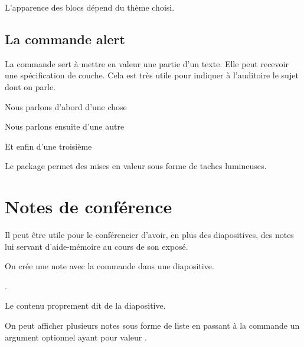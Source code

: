 L'apparence des blocs dépend du thème choisi.

\subsection{La commande alert}

La commande  sert à mettre en valeur une partie d'un texte. Elle peut recevoir une spécification de couche. Cela est très utile pour indiquer à l'auditoire le sujet dont on parle. 

\begin{latexcode}
\begin{frame}
\begin{description}
    \item\alert<1>{Nous parlons d'abord d'une chose}
    \item\alert<2>{Nous parlons ensuite d'une autre}
    \item\alert<3>{Et enfin d'une troisième}
\end{description}
\end{frame}
\end{latexcode}

\begin{plusloins}

Le package  permet des mises en valeur sous forme de taches lumineuses.

\end{plusloins}
\section{Notes de conférence}

Il peut être utile pour le conférencier d'avoir, en plus des diapositives, des notes  lui servant d'aide-mémoire au cours de son exposé.

On  crée une note avec la commande  dans une diapositive.

\begin{latexcode}
\begin{frame}
.
    
Le contenu proprement dit de la diapositive.
\end{frame}
\end{latexcode}

On peut afficher plusieurs notes sous forme de liste en passant  à la commande  un argument optionnel ayant pour valeur .

